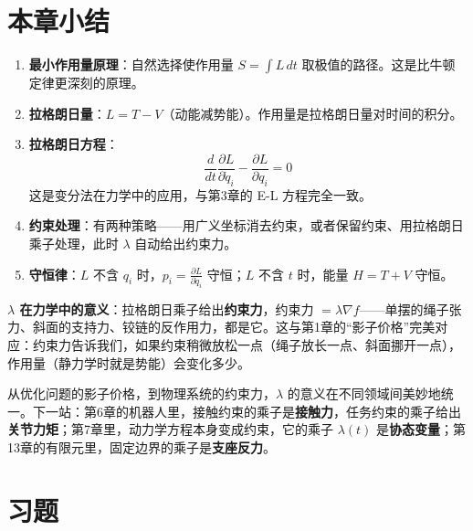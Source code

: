 \section{本章小结}

\begin{enumerate}
    \item \textbf{最小作用量原理}：自然选择使作用量 $S = \int L \, dt$ 取极值的路径。这是比牛顿定律更深刻的原理。
    
    \item \textbf{拉格朗日量}：$L = T - V$（动能减势能）。作用量是拉格朗日量对时间的积分。
    
    \item \textbf{拉格朗日方程}：
    \[
    \frac{d}{dt}\frac{\partial L}{\partial \dot{q}_i} - \frac{\partial L}{\partial q_i} = 0
    \]
    这是变分法在力学中的应用，与第3章的 E-L 方程完全一致。
    
    \item \textbf{约束处理}：有两种策略——用广义坐标消去约束，或者保留约束、用拉格朗日乘子处理，此时 $\lambda$ 自动给出约束力。

    \item \textbf{守恒律}：$L$ 不含 $q_i$ 时，$p_i = \frac{\partial L}{\partial \dot{q}_i}$ 守恒；$L$ 不含 $t$ 时，能量 $H = T + V$ 守恒。
\end{enumerate}

\begin{physicalmeaning}
\textbf{$\lambda$ 在力学中的意义}：拉格朗日乘子给出\textbf{约束力}，约束力 $= \lambda \nabla f$——单摆的绳子张力、斜面的支持力、铰链的反作用力，都是它。这与第1章的“影子价格”完美对应：约束力告诉我们，如果约束稍微放松一点（绳子放长一点、斜面挪开一点），作用量（静力学时就是势能）会变化多少。

从优化问题的影子价格，到物理系统的约束力，$\lambda$ 的意义在不同领域间美妙地统一。下一站：第6章的机器人里，接触约束的乘子是\textbf{接触力}，任务约束的乘子给出\textbf{关节力矩}；第7章里，动力学方程本身变成约束，它的乘子 $\lambda(t)$ 是\textbf{协态变量}；第13章的有限元里，固定边界的乘子是\textbf{支座反力}。
\end{physicalmeaning}

\section{习题}

